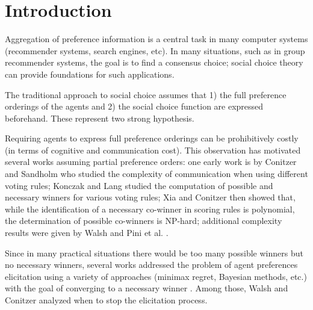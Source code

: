 \documentclass[runningheads]{llncs}
\begin{document}
\section{Introduction}
Aggregation of preference information is a central task in many computer systems (recommender systems, search engines, etc).
In many situations, such as in group recommender systems, the goal is to find a consensus choice;
social choice theory can provide foundations for such applications.

The traditional approach to social choice assumes that 1) the full preference orderings of the agents and 2) the social choice function are expressed beforehand. These represent two strong hypothesis.

Requiring agents to express full preference orderings can be prohibitively costly (in terms of cognitive and communication cost).
This observation has motivated several works assuming partial preference orders: 
one early work is  by Conitzer and Sandholm \cite{Conitzer2005} who studied the complexity of communication when using different voting rules; %
Konczak and Lang \cite{Konczak05} studied the computation of possible and necessary winners for various voting rules; %
Xia and Conitzer \cite{Xia2008} then showed that, while the identification of a necessary co-winner in scoring rules is polynomial,  the determination of possible co-winners is NP-hard;
additional complexity results were given by Walsh \cite{Walsh2007} and Pini et al. \cite{Pini2007}.

Since in many practical situations there would be too many possible winners but no necessary winners, several works addressed the problem of agent preferences elicitation using a variety of approaches (minimax regret, Bayesian methods, etc.) with the goal of converging to a necessary winner \cite{Naamani-Dery2015,Kalech2011,Lu2011,Pini2009,Benabbou2016,Dey2016,Dey2016_2}. Among those, Walsh \cite{Walsh2009} and Conitzer \cite{Conitzer2009} analyzed when to stop the elicitation process.
\end{document}
